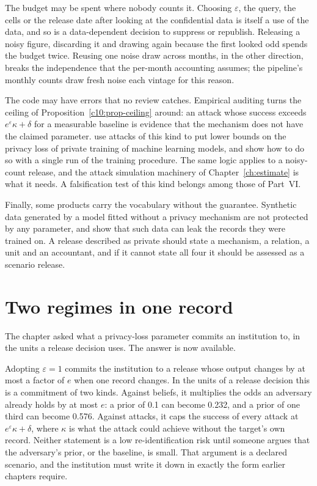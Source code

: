 The budget may be spent where nobody counts it. Choosing $\varepsilon$, the
query, the cells or the release date after looking at the confidential data is
itself a use of the data, and so is a data-dependent decision to suppress or
republish. Releasing a noisy figure, discarding it and drawing again because the
first looked odd spends the budget twice. Reusing one noise draw across months,
in the other direction, breaks the independence that the per-month accounting
assumes; the pipeline's monthly counts draw fresh noise each vintage for this
reason.

The code may have errors that no review catches. Empirical auditing turns the
ceiling of Proposition~\ref{c10:prop-ceiling} around: an attack whose success
exceeds $e^\varepsilon\kappa + \delta$ for a measurable baseline is evidence that
the mechanism does not have the claimed parameter. \citet{jagielski2020} use
attacks of this kind to put lower bounds on the privacy loss of private training
of machine learning models, and \citet{steinke2023} show how to do so with a single
run of the training procedure. The same logic applies to a noisy-count release,
and the attack simulation machinery of Chapter~\ref{ch:estimate} is what it needs.
A falsification test of this kind belongs among those of Part~VI.

Finally, some products carry the vocabulary without the guarantee. Synthetic data
generated by a model fitted without a privacy mechanism are not protected by any
parameter, and \citet{stadler2022} show that such data can leak the records they
were trained on. A release described as private should state a mechanism, a
relation, a unit and an accountant, and if it cannot state all four it should be
assessed as a scenario release.

\section{Two regimes in one record}

The chapter asked what a privacy-loss parameter commits an institution to, in the
units a release decision uses. The answer is now available.

Adopting $\varepsilon = 1$ commits the institution to a release whose output
changes by at most a factor of $e$ when one record changes. In the units of a
release decision this is a commitment of two kinds. Against beliefs, it multiplies
the odds an adversary already holds by at most $e$: a prior of 0.1 can become
0.232, and a prior of one third can become 0.576. Against attacks, it caps the
success of every attack at $e^\varepsilon\kappa + \delta$, where $\kappa$ is what
the attack could achieve without the target's own record. Neither statement is a
low re-identification risk until someone argues that the adversary's prior, or the
baseline, is small. That argument is a declared scenario, and the institution must
write it down in exactly the form earlier chapters require.

